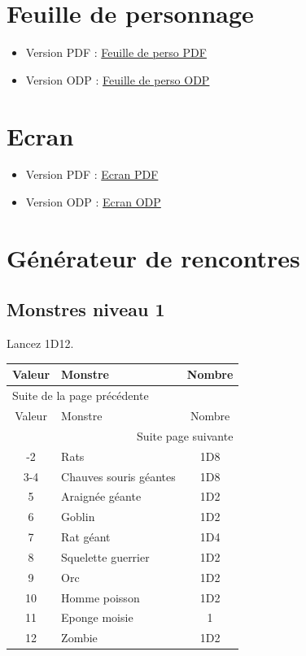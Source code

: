 \documentclass[a4paper, 11pt, twoside]{article}
\begin{document}
\section{Feuille de personnage}
\label{sec:org64e2ce3}

\begin{itemize}
\item Version PDF : \href{https://github.com/orey/jdr/blob/master/DungeonSquad-fr/DungeonSquadFr-FeuillePerso.pdf}{Feuille de perso PDF}
\item Version ODP : \href{https://github.com/orey/jdr/blob/master/DungeonSquad-fr/DungeonSquadFr-FeuillePerso.odp}{Feuille de perso ODP}
\end{itemize}

\section{Ecran}
\label{sec:orgaa0d0d9}

\begin{itemize}
\item Version PDF : \href{https://github.com/orey/jdr/blob/master/DungeonSquad-fr/DungeonSquadFr-Ecran.pdf}{Ecran PDF}
\item Version ODP : \href{https://github.com/orey/jdr/blob/master/DungeonSquad-fr/DungeonSquadFr-Ecran.odp}{Ecran ODP}
\end{itemize}

\section{Générateur de rencontres}
\label{sec:org10ca7f2}

\subsection{Monstres niveau 1}
\label{sec:orgd6396f6}

Lancez 1D12.

\begin{longtable}{c|l|c}
Valeur & Monstre & Nombre\\
\hline
\endfirsthead
\multicolumn{3}{l}{Suite de la page précédente} \\
\hline

Valeur & Monstre & Nombre \\

\hline
\endhead
\hline\multicolumn{3}{r}{Suite page suivante} \\
\endfoot
\endlastfoot
\hline
1-2 & Rats & 1D8\\
3-4 & Chauves souris géantes & 1D8\\
5 & Araignée géante & 1D2\\
6 & Goblin & 1D2\\
7 & Rat géant & 1D4\\
8 & Squelette guerrier & 1D2\\
9 & Orc & 1D2\\
10 & Homme poisson & 1D2\\
11 & Eponge moisie & 1\\
12 & Zombie & 1D2\\
\end{longtable}
\end{document}
